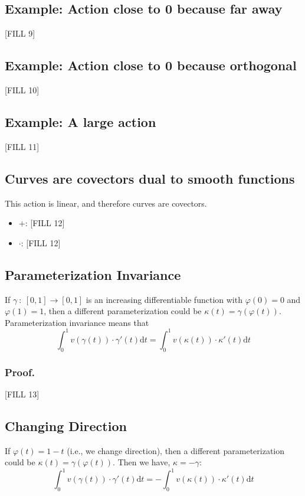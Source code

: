 \documentclass[10pt]{article}
\begin{document}
\subsection*{Example: Action close to 0 because far away}
[FILL 9]

\subsection*{Example: Action close to 0 because orthogonal}
[FILL 10]

\subsection*{Example: A large action}
[FILL 11]

\subsection*{Curves are covectors dual to smooth functions}
This action is linear, and therefore curves are covectors.
\begin{itemize}
    \item $+$: [FILL 12]
    \item $\cdot$: [FILL 12]
\end{itemize}

\subsection*{Parameterization Invariance}
If $\gamma \::\: [0, 1] \rightarrow [0, 1]$ is an increasing differentiable function with $\varphi(0) = 0$ and $\varphi(1) = 1$, then a different parameterization could be $\kappa(t) = \gamma(\varphi(t))$.  Parameterization invariance means that
\[\int_0^1 v(\gamma(t)) \cdot \gamma'(t) \text{d}t = \int_0^1 v(\kappa(t)) \cdot \kappa'(t) \text{d}t\]

\subsubsection*{Proof.}
[FILL 13]

\subsection*{Changing Direction}
If $\varphi(t) = 1 - t$ (i.e., we change direction), then a different parameterization could be $\kappa(t) = \gamma(\varphi(t))$.  Then we have, $\kappa = -\gamma$:
\[\int_0^1 v(\gamma(t)) \cdot \gamma'(t) \text{d}t = - \int_0^1 v(\kappa(t)) \cdot \kappa'(t) \text{d}t\]
\end{document}

